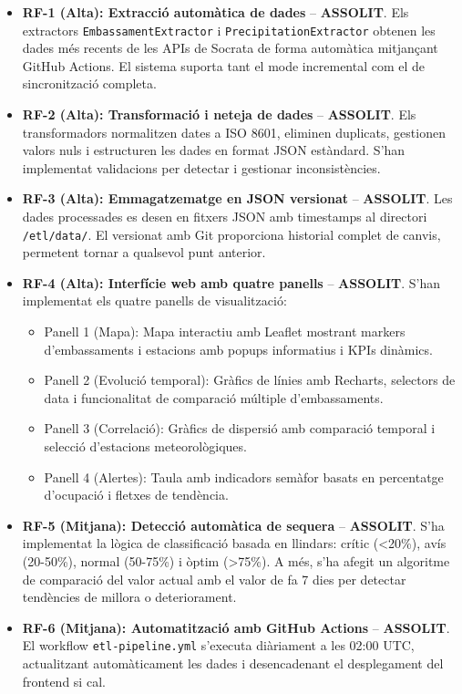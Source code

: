 \begin{itemize}
    \item \textbf{RF-1 (Alta): Extracció automàtica de dades} -- \textbf{ASSOLIT}. Els extractors \texttt{EmbassamentExtractor} i \texttt{PrecipitationExtractor} obtenen les dades més recents de les APIs de Socrata de forma automàtica mitjançant GitHub Actions. El sistema suporta tant el mode incremental com el de sincronització completa.
    
    \item \textbf{RF-2 (Alta): Transformació i neteja de dades} -- \textbf{ASSOLIT}. Els transformadors normalitzen dates a ISO 8601, eliminen duplicats, gestionen valors nuls i estructuren les dades en format JSON estàndard. S'han implementat validacions per detectar i gestionar inconsistències.
    
    \item \textbf{RF-3 (Alta): Emmagatzematge en JSON versionat} -- \textbf{ASSOLIT}. Les dades processades es desen en fitxers JSON amb timestamps al directori \texttt{/etl/data/}. El versionat amb Git proporciona historial complet de canvis, permetent tornar a qualsevol punt anterior.
    
    \item \textbf{RF-4 (Alta): Interfície web amb quatre panells} -- \textbf{ASSOLIT}. S'han implementat els quatre panells de visualització:
    \begin{itemize}
        \item Panell 1 (Mapa): Mapa interactiu amb Leaflet mostrant markers d'embassaments i estacions amb popups informatius i KPIs dinàmics.
        \item Panell 2 (Evolució temporal): Gràfics de línies amb Recharts, selectors de data i funcionalitat de comparació múltiple d'embassaments.
        \item Panell 3 (Correlació): Gràfics de dispersió amb comparació temporal i selecció d'estacions meteorològiques.
        \item Panell 4 (Alertes): Taula amb indicadors semàfor basats en percentatge d'ocupació i fletxes de tendència.
    \end{itemize}
    
    \item \textbf{RF-5 (Mitjana): Detecció automàtica de sequera} -- \textbf{ASSOLIT}. S'ha implementat la lògica de classificació basada en llindars: crític (\textless20\%), avís (20-50\%), normal (50-75\%) i òptim (\textgreater75\%). A més, s'ha afegit un algoritme de comparació del valor actual amb el valor de fa 7 dies per detectar tendències de millora o deteriorament.
    
    \item \textbf{RF-6 (Mitjana): Automatització amb GitHub Actions} -- \textbf{ASSOLIT}. El workflow \texttt{etl-pipeline.yml} s'executa diàriament a les 02:00 UTC, actualitzant automàticament les dades i desencadenant el desplegament del frontend si cal.
\end{itemize}

